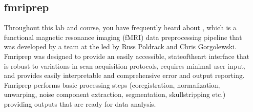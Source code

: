 \documentclass[letterpaper,10pt,english]{sphinxmanual}
\begin{document}
\begin{sphinxVerbatim}[commandchars=\\\{\}]
      
     
             
     
             
    
     
     
     

 
\end{sphinxVerbatim}

\noindent{}


\subsection{fmriprep}
\label{\detokenize{content/Preprocessing:fmriprep}}
Throughout this lab and course, you have frequently heard about , which is a functional magnetic resonance imaging (fMRI) data preprocessing pipeline that was developed by a team at the  led by Russ Poldrack and Chris Gorgolewski. Fmriprep was designed to provide an easily accessible, state\sphinxhyphen{}of\sphinxhyphen{}the\sphinxhyphen{}art interface that is robust to variations in scan acquisition protocols, requires minimal user input, and provides easily interpretable and comprehensive error and output reporting. Fmriprep performs basic processing steps (coregistration, normalization, unwarping, noise component extraction, segmentation, skullstripping etc.) providing outputs that are ready for data analysis.
\end{document}
